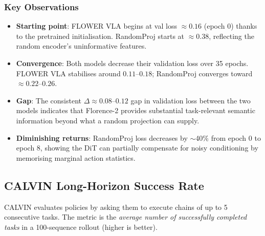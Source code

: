 \documentclass[11pt,a4paper]{article}
\begin{document}
\subsubsection{Key Observations}

\begin{itemize}
  \item \textbf{Starting point}: FLOWER VLA begins at val loss $\approx0.16$
        (epoch 0) thanks to the pretrained initialisation.  RandomProj starts
        at $\approx0.38$, reflecting the random encoder's uninformative features.
  \item \textbf{Convergence}: Both models decrease their validation loss over
        35 epochs.  FLOWER VLA stabilises around $0.11$--$0.18$; RandomProj
        converges toward $\approx0.22$--$0.26$.
  \item \textbf{Gap}: The consistent $\Delta\approx0.08$--$0.12$ gap in
        validation loss between the two models indicates that Florence-2
        provides substantial task-relevant semantic information beyond what a
        random projection can supply.
  \item \textbf{Diminishing returns}: RandomProj loss decreases by $\sim$40\%
        from epoch 0 to epoch 8, showing the DiT can partially compensate for
        noisy conditioning by memorising marginal action statistics.
\end{itemize}

\subsection{CALVIN Long-Horizon Success Rate}
\label{sec:successrate}

CALVIN evaluates policies by asking them to execute chains of up to 5
consecutive tasks.  The metric is the \emph{average number of successfully
completed tasks} in a 100-sequence rollout (higher is better).
\end{document}
